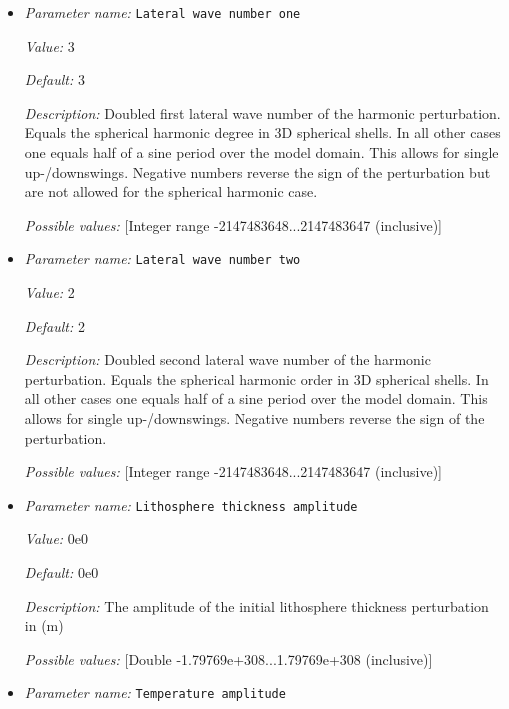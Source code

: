 \begin{itemize}
\item {\it Parameter name:} {\tt Lateral wave number one}
\label{parameters:Initial conditions/Solidus/Perturbation/Lateral wave number one}


{\it Value:} 3


{\it Default:} 3


{\it Description:} Doubled first lateral wave number of the harmonic perturbation. Equals the spherical harmonic degree in 3D spherical shells. In all other cases one equals half of a sine period over the model domain. This allows for single up-/downswings. Negative numbers reverse the sign of the perturbation but are not allowed for the spherical harmonic case.


{\it Possible values:} [Integer range -2147483648...2147483647 (inclusive)]
\item {\it Parameter name:} {\tt Lateral wave number two}
\label{parameters:Initial conditions/Solidus/Perturbation/Lateral wave number two}


{\it Value:} 2


{\it Default:} 2


{\it Description:} Doubled second lateral wave number of the harmonic perturbation. Equals the spherical harmonic order in 3D spherical shells. In all other cases one equals half of a sine period over the model domain. This allows for single up-/downswings. Negative numbers reverse the sign of the perturbation.


{\it Possible values:} [Integer range -2147483648...2147483647 (inclusive)]
\item {\it Parameter name:} {\tt Lithosphere thickness amplitude}
\label{parameters:Initial conditions/Solidus/Perturbation/Lithosphere thickness amplitude}


{\it Value:} 0e0


{\it Default:} 0e0


{\it Description:} The amplitude of the initial lithosphere thickness perturbation in (m)


{\it Possible values:} [Double -1.79769e+308...1.79769e+308 (inclusive)]
\item {\it Parameter name:} {\tt Temperature amplitude}
\label{parameters:Initial conditions/Solidus/Perturbation/Temperature amplitude}



\end{itemize}
